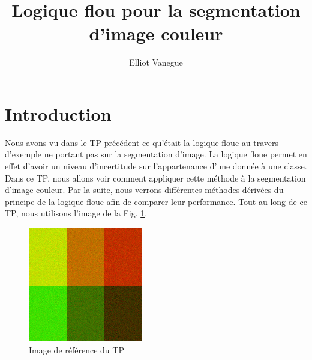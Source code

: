 \documentclass[a4paper,11pt]{article}
\title{Logique flou pour la segmentation d'image couleur}
\author{Elliot Vanegue}
\begin{document}
\maketitle


\section{Introduction}
Nous avons vu dans le TP précédent ce qu'était la logique floue au travers d'exemple ne portant pas 
sur la segmentation d'image. La logique floue permet en effet d'avoir un niveau d'incertitude sur 
l'appartenance d'une donnée à une classe. Dans ce TP, nous allons voir comment appliquer cette méthode
à la segmentation d'image couleur. Par la suite, nous verrons différentes méthodes dérivées du 
principe de la logique floue afin de comparer leur performance. Tout au long de ce TP, nous utilisons
l'image de la Fig. \ref{fig:reference}.

\begin{figure}[!h]
  \begin{center}
    \includegraphics[width=5cm]{6_classes_RGB.png}
    \caption{Image de référence du TP}
    \label{fig:reference}
  \end{center}
\end{figure}
\end{document}

